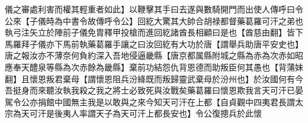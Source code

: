 儀之審處利害而權其輕重者如此】以鞭擊其手曰去遂與數騎開門而出使人傳呼曰令公來【子儀時為中書令故傳呼令公】回紇大驚其大帥合胡禄都督藥葛羅可汗之弟也執弓注矢立於陣前子儀免胄釋甲投槍而進回紇諸酋長相顧曰是也【酋慈由翻】皆下馬羅拜子儀亦下馬前執藥葛羅手讓之曰汝回紇有大功於唐【謂舉兵助唐平安史也】唐之報汝亦不薄奈何負約深入吾地侵逼畿縣【唐京都属縣附城之縣為赤為次赤如昭應奉天醴泉等縣為次赤餘為畿縣】棄前功結怨仇背恩德而助叛臣何其愚也【背蒲妹翻】且懷恩叛君棄母【謂懷恩阻兵汾絳既而叛歸靈武棄母於汾州也】於汝國何有今吾挺身而來聽汝執我殺之我之將士必致死與汝戰矣藥葛羅曰懷恩欺我言天可汗已晏駕令公亦捐館中國無主我是以敢與之來今知天可汗在上都【自貞觀中四夷君長謂太宗為天可汗是後夷人率謂天子為天可汗上都長安也】令公復摠兵於此懷